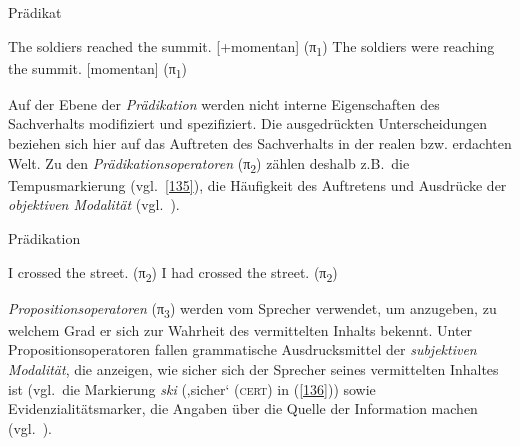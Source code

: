 \begin{exe}
	\ex\label{134} 
	Prädikat
		\begin{xlist}	
			\ex\label{134a} The soldiers reached the summit. [+momentan] (π\textsubscript{1})
			\ex\label{134b} The soldiers were reaching the summit. [\textminus momentan] (π\textsubscript{1}) 
		\end{xlist}
	\hfill\hbox{\citet[134]{Hengeveld1989}}	
\end{exe}														
Auf der Ebene der \textit{Prädikation} werden nicht interne Eigenschaften des Sachverhalts modifiziert und spezifiziert. Die ausgedrückten Unterscheidungen beziehen sich hier auf das Auftreten des Sachverhalts in der realen bzw. erdachten Welt. Zu den \textit{Prädikationsoperatoren} (π\textsubscript{2})  zählen deshalb z.B.\ die Tempusmarkierung (vgl.\ \ref{135}), die Häufigkeit des Auftretens und Ausdrücke der \textit{objektiven Modalität} (vgl.\ \citealt[135--138]{Hengeveld1989}).

\begin{exe}
	\ex\label{135} 
	Prädikation
		\begin{xlist}	
			\ex\label{135a} I crossed the street. (π\textsubscript{2})
			\ex\label{135b} I had crossed the street. (π\textsubscript{2}) 
	\hfill\hbox{\citet[136]{Hengeveld1989}}	
	\end{xlist}
\end{exe}
\textit{Propositionsoperatoren} (π\textsubscript{3})  werden vom Sprecher verwendet, um anzugeben, zu welchem Grad er sich zur Wahrheit des vermittelten Inhalts bekennt. Unter Propositionsoperatoren fallen grammatische Ausdrucksmittel der \textit{subjektiven Mo\-dalität}, die anzeigen, wie  sicher sich der Sprecher seines vermittelten Inhaltes ist (vgl.\ die Markierung \textit{ski} (‚sicher‘ (\textsc{cert}) in (\ref{136})) sowie Evidenzialitätsmarker, die Angaben über die Quelle der Information machen (vgl.\ \citealt[138--140]{Hengeveld1989}). 

